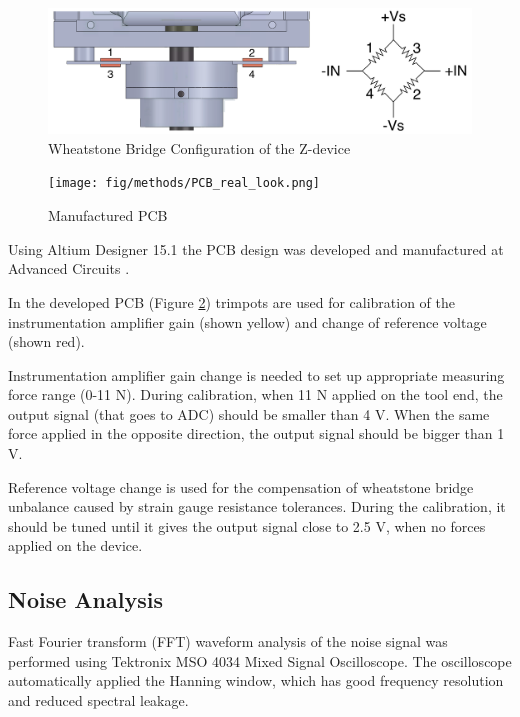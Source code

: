 \begin{figure}[h]
	\begin{center}
		\includegraphics[width=140mm]{fig/methods/Wiring_z.pdf}
	\end{center}
	\vspace{-4mm}
	\caption[Wheatstone Bridge Configuration of the Z-device]
	{Wheatstone Bridge Configuration of the Z-device}
	\label{fig:WB_z}
	\vspace{-2mm}
\end{figure}
	
\begin{figure}[h]
	\begin{center}
		\texttt{[image: fig/methods/PCB\_real\_look.png]}
	\end{center}
	\vspace{-4mm}
	\caption[Manufactured PCB]
	{Manufactured PCB}
	\label{fig:PCB_real}
	\vspace{-2mm}
\end{figure}
	
Using Altium Designer 15.1 the PCB design was developed and manufactured at Advanced Circuits \cite{PCB_manufacturer}. 

In the developed PCB (Figure \ref{fig:PCB_real}) trimpots are used for calibration of the instrumentation amplifier gain (shown yellow) and change of reference voltage (shown red).

Instrumentation amplifier gain change is needed to set up appropriate measuring force range (0-11 N). During calibration, when 11 N applied on the tool end, the output signal (that goes to ADC) should be smaller than 4 V. When the same force applied in the opposite direction, the output signal should be bigger than 1 V.
 
Reference voltage change is used for the compensation of wheatstone bridge unbalance caused by strain gauge resistance tolerances. During the calibration, it should be tuned until it gives the output signal close to 2.5 V, when no forces applied on the device.


	\subsection{Noise Analysis}
	\label{sec:NoiseExp}
	Fast Fourier transform (FFT) waveform analysis of the noise signal was performed using Tektronix MSO 4034 Mixed Signal Oscilloscope. The oscilloscope automatically applied the Hanning window, which has good frequency resolution and reduced spectral leakage\cite{harris_use_1978}.
	
